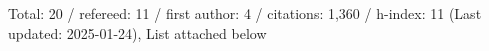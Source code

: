 Total: 20 / refereed: 11 / first author: 4 / citations: 1,360 / h-index: 11 (Last updated: 2025-01-24), List attached below